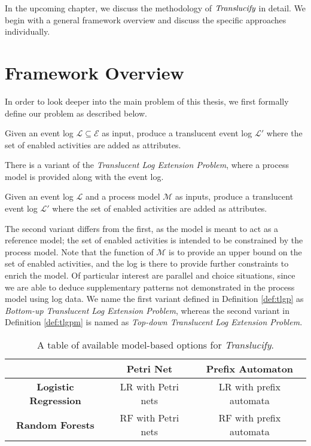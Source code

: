 In the upcoming chapter, we discuss the methodology of $\emph{Translucify}$ in detail. We begin with a general framework overview and discuss the specific approaches individually.

\section{Framework Overview}
In order to look deeper into the main problem of this thesis, we first formally define our problem as described below.

\begin{definition}
\label{def:tlgp}
    Given an event log $\mathcal{L} \subseteq \mathcal{E}$ as input, produce a translucent event log $\mathcal{L'}$ where the set of enabled activities are added as attributes. 
\end{definition}

There is a variant of the \emph{Translucent Log Extension Problem}, where a process model is provided along with the event log.

\begin{definition}
\label{def:tlgpm}
    Given an event log $\mathcal{L}$ and a process model $\mathcal{M}$ as inputs, produce a translucent event log $\mathcal{L'}$ where the set of enabled activities are added as attributes. 
\end{definition}

The second variant differs from the first, as the model is meant to act as a reference model; the set of enabled activities is intended to be constrained by the process model. Note that the function of $\mathcal{M}$ is to provide an upper bound on the set of enabled activities, and the log is there to provide further constraints to enrich the model. Of particular interest are parallel and choice situations, since we are able to deduce supplementary patterns not demonstrated in the process model using log data. We name the first variant defined in Definition \ref{def:tlgp} as \emph{Bottom-up Translucent Log Extension Problem}, whereas the second variant in Definition \ref{def:tlgpm} is named as \emph{Top-down Translucent Log Extension Problem.}


\begin{table}[h]
    \centering
	\caption{A table of available model-based options for \emph{Translucify}.}
    \begin{tabular}{|c|c|c|}
        \hline
        & \textbf{Petri Net} & \textbf{Prefix Automaton} \\ 
        \hline
        \textbf{Logistic Regression} & LR with Petri nets & LR with prefix automata \\
        \hline
        \textbf{Random Forests} & RF with Petri nets & RF with prefix automata \\
        \hline
    \end{tabular}
    \label{tab:framework_overview}
\end{table}

